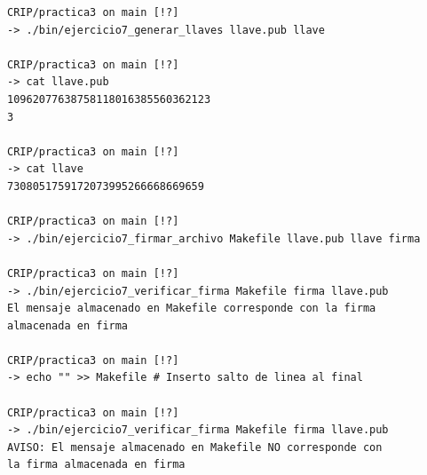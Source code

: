 \documentclass[12pt, spanish]{article}
\begin{document}
\begin{lstlisting}
CRIP/practica3 on main [!?]
-> ./bin/ejercicio7_generar_llaves llave.pub llave

CRIP/practica3 on main [!?]
-> cat llave.pub
10962077638758118016385560362123
3

CRIP/practica3 on main [!?]
-> cat llave
7308051759172073995266668669659

CRIP/practica3 on main [!?]
-> ./bin/ejercicio7_firmar_archivo Makefile llave.pub llave firma

CRIP/practica3 on main [!?]
-> ./bin/ejercicio7_verificar_firma Makefile firma llave.pub
El mensaje almacenado en Makefile corresponde con la firma
almacenada en firma

CRIP/practica3 on main [!?]
-> echo "" >> Makefile # Inserto salto de linea al final

CRIP/practica3 on main [!?]
-> ./bin/ejercicio7_verificar_firma Makefile firma llave.pub
AVISO: El mensaje almacenado en Makefile NO corresponde con
la firma almacenada en firma
\end{lstlisting}
\end{document}
